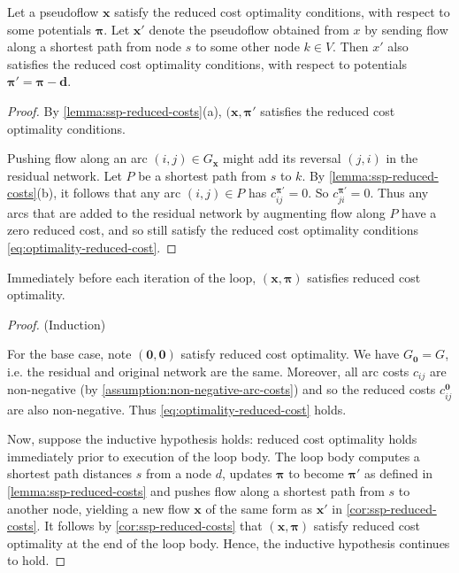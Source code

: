 \begin{cor} \label{cor:ssp-reduced-costs}
Let a pseudoflow $\mathbf{x}$ satisfy the reduced cost optimality conditions, with respect to some potentials $\boldsymbol{\pi}$. Let $\mathbf{x}'$ denote the pseudoflow obtained from $x$ by sending flow along a shortest path from node $s$ to some other node $k \in V$. Then $x'$ also satisfies the reduced cost optimality conditions, with respect to potentials $\boldsymbol{\pi}' = \boldsymbol{\pi} - \mathbf{d}$.
\end{cor}
\begin{proof}
By \cref{lemma:ssp-reduced-costs}(a), $(\mathbf{x},\boldsymbol{\pi'}$ satisfies the reduced cost optimality conditions.

Pushing flow along an arc $(i,j) \in G_{\mathbf{x}}$ might add its reversal $(j,i)$ in the residual network. Let $P$ be a shortest path from $s$ to $k$. By \cref{lemma:ssp-reduced-costs}(b), it follows that any arc $(i,j) \in P$ has $c^{\boldsymbol{\pi}'}_{ij} = 0$. So $c^{\boldsymbol{\pi}'}_{ji} = 0$. Thus any arcs that are added to the residual network by augmenting flow along $P$ have a zero reduced cost, and so still satisfy the reduced cost optimality conditions \cref{eq:optimality-reduced-cost}.
\end{proof}

\begin{thm} \label{thm:ssp-invariant}
Immediately before each iteration of the loop, $(\mathbf{x},\boldsymbol{\pi})$ satisfies reduced cost optimality.
\end{thm}
\begin{proof} (Induction)
    
For the base case, note $(\mathbf{0},\mathbf{0})$ satisfy reduced cost optimality. We have $G_{\boldsymbol{0}} = G$, i.e. the residual and original network are the same. Moreover, all arc costs $c_{ij}$ are non-negative (by \cref{assumption:non-negative-arc-costs}) and so the reduced costs $c^{\boldsymbol{0}}_{ij}$ are also non-negative. Thus \cref{eq:optimality-reduced-cost} holds.

Now, suppose the inductive hypothesis holds: reduced cost optimality holds immediately prior to execution of the loop body. The loop body computes a shortest path distances $s$ from a node $d$, updates $\boldsymbol{\pi}$ to become $\boldsymbol{\pi'}$ as defined in \cref{lemma:ssp-reduced-costs} and pushes flow along a shortest path from $s$ to another node, yielding a new flow $\mathbf{x}$ of the same form as $\mathbf{x'}$ in \cref{cor:ssp-reduced-costs}. It follows by \cref{cor:ssp-reduced-costs} that $(\mathbf{x},\boldsymbol{\pi})$ satisfy reduced cost optimality at the end of the loop body. Hence, the inductive hypothesis continues to hold.
\end{proof}

